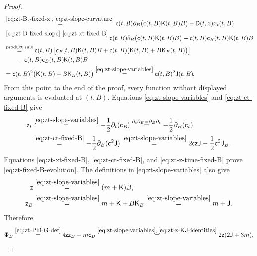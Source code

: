 \documentclass[10pt]{amsart}
\theoremstyle{definition}
\theoremstyle{remark}
\numberwithin{equation}{section}
\newcommand{\1}{\mathbf 1}
\newcommand{\stackref}[2]{\stackrel{#2}{#1}}
\begin{document}
\begin{proof}
\begin{align}
 &\stackref{=}{\eqref{eq:zt-Bt-fixed-x},\,\eqref{eq:zt-slope-curvature}}
 \mathsf c(t,B)\partial_B\bigl(\mathsf c(t,B)\mathsf K(t,B)B\bigr)+\mathsf D(t,x)x_t(t,B)\notag\\
 &\stackref{=}{\eqref{eq:zt-D-fixed-slope},\,\eqref{eq:zt-xt-fixed-B}}
 \mathsf c(t,B)\partial_B\bigl(\mathsf c(t,B)\mathsf K(t,B)B\bigr)-\mathsf c(t,B)\mathsf c_B(t,B)\mathsf K(t,B)B\notag\\
 &\stackref{=}{\text{product rule}}
 \mathsf c(t,B)\left[\mathsf c_B(t,B)\mathsf K(t,B)B+\mathsf c(t,B)\bigl(\mathsf K(t,B)+B\mathsf K_B(t,B)\bigr)\right]\notag\\
 &\qquad-\mathsf c(t,B)\mathsf c_B(t,B)\mathsf K(t,B)B\notag\\
 &=\mathsf c(t,B)^2\bigl(\mathsf K(t,B)+B\mathsf K_B(t,B)\bigr)
 \stackref{=}{\eqref{eq:zt-slope-variables}}
 \mathsf c(t,B)^2\mathsf J(t,B).
 \label{eq:zt-ct-fixed-B}
\end{align}
From this point to the end of the proof, every function without displayed arguments is evaluated at $(t,B)$. Equations \eqref{eq:zt-slope-variables} and \eqref{eq:zt-ct-fixed-B} give
\begin{align}
 \mathsf z_t
 &\stackref{=}{\eqref{eq:zt-slope-variables}}
 -\frac12\partial_t(\mathsf c_B)
 \stackref{=}{\partial_t\partial_B=\partial_B\partial_t}
 -\frac12\partial_B(\mathsf c_t)\notag\\
 &\stackref{=}{\eqref{eq:zt-ct-fixed-B}}
 -\frac12\partial_B(\mathsf c^2\mathsf J)
 \stackref{=}{\eqref{eq:zt-slope-variables}}
 2\mathsf c\mathsf z\mathsf J-\frac12\mathsf c^2\mathsf J_B.
 \label{eq:zt-z-time-fixed-B}
\end{align}
Equations \eqref{eq:zt-xt-fixed-B}, \eqref{eq:zt-ct-fixed-B}, and \eqref{eq:zt-z-time-fixed-B} prove \eqref{eq:zt-fixed-B-evolution}. The definitions in \eqref{eq:zt-slope-variables} also give
\begin{align}
 \mathsf z
 &\stackref{=}{\eqref{eq:zt-slope-variables}}
 (m+\mathsf K)B,\notag\\
 \mathsf z_B
 &\stackref{=}{\eqref{eq:zt-slope-variables}}
 m+\mathsf K+B\mathsf K_B
 \stackref{=}{\eqref{eq:zt-slope-variables}}
 m+\mathsf J.
 \label{eq:zt-z-KJ-identities}
\end{align}
Therefore
\begin{equation*}
 \Phi_B
 \stackref{=}{\eqref{eq:zt-Phi-G-def}}
 4\mathsf z\mathsf z_B-m\mathsf c_B
 \stackref{=}{\eqref{eq:zt-slope-variables},\,\eqref{eq:zt-z-KJ-identities}}
 2\mathsf z(2\mathsf J+3m),
\end{equation*}

\end{proof}
\end{document}
